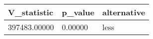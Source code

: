 \begin{table}
\centering
\begin{tabular}[t]{lll}
\toprule
V\_statistic & p\_value & alternative\\
\midrule
397483.00000 & 0.00000 & less\\
\bottomrule
\end{tabular}
\end{table}
